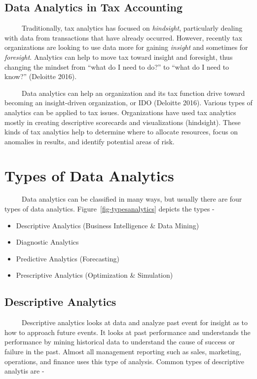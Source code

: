 \documentclass[
  letterpaper,
  DIV=11,
  numbers=noendperiod]{scrreprt}
\begin{document}
\subsection{Data Analytics in Tax
Accounting}\label{data-analytics-in-tax-accounting}

~~~~~Traditionally, tax analytics has focused on \emph{hindsight},
particularly dealing with data from transactions that have already
occurred. However, recently tax organizations are looking to use data
more for gaining \emph{insight} and sometimes for \emph{foresight}.
Analytics can help to move tax toward insight and foresight, thus
changing the mindset from ``what do I need to do?'' to ``what do I need
to know?'' (Deloitte 2016).

~~~~~Data analytics can help an organization and its tax function drive
toward becoming an insight-driven organization, or IDO (Deloitte 2016).
Various types of analytics can be applied to tax issues. Organizations
have used tax analytics mostly in creating descriptive scorecards and
visualizations (hindsight). These kinds of tax analytics help to
determine where to allocate resources, focus on anomalies in results,
and identify potential areas of risk.

\section{Types of Data Analytics}\label{types-of-data-analytics}

~~~~~Data analytics can be classified in many ways, but usually there
are four types of data analytics. Figure~\ref{fig-typesanalytics}
depicts the types -

\begin{itemize}
\item
  Descriptive Analytics (Business Intelligence \& Data Mining)
\item
  Diagnostic Analytics
\item
  Predictive Analytics (Forecasting)
\item
  Prescriptive Analytics (Optimization \& Simulation)
\end{itemize}

\subsection{Descriptive Analytics}\label{descriptive-analytics}

~~~~~Descriptive analytics looks at data and analyze past event for
insight as to how to approach future events. It looks at past
performance and understands the performance by mining historical data to
understand the cause of success or failure in the past. Almost all
management reporting such as sales, marketing, operations, and finance
uses this type of analysis. Common types of descriptive analytis are -
\end{document}
